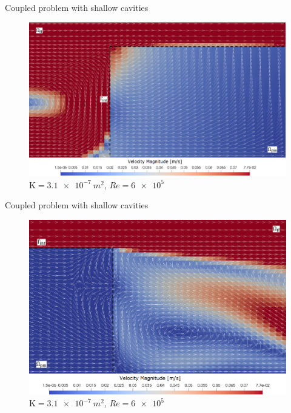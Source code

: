 \documentclass{beamer}
\begin{document}
\begin{frame}{Coupled problem with shallow cavities}
\begin{figure}
	\centering
	\includegraphics[height=0.8\textheight]{coupled_first_cavity_slides_labels.png}
	\caption{\tiny $\mathrm{K}=\SI{3.1e-7}{m^2}$, $Re=\num{6e5}$}
\end{figure}
\end{frame}
\begin{frame}{Coupled problem with shallow cavities}
\begin{figure}
	\centering
	\includegraphics[height=0.82\textheight]{coupled_second_cavity_slides_labels.png}
	\caption{\tiny $\mathrm{K}=\SI{3.1e-7}{m^2}$, $Re=\num{6e5}$}
\end{figure}
\end{frame}
\end{document}
